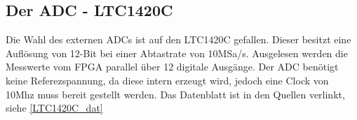 \subsection{Der ADC - LTC1420C}\label{extADC}
 Die Wahl des externen ADCs ist auf den LTC1420C gefallen. Dieser besitzt eine Auflösung von 12-Bit bei einer Abtastrate von 10MSa/s.  Ausgelesen werden die Messwerte vom FPGA parallel über 12 digitale Ausgänge. Der ADC benötigt keine Referezspannung, da diese intern erzeugt wird, jedoch eine Clock von 10Mhz muss bereit gestellt werden.
Das Datenblatt ist in den Quellen verlinkt, siehe \ref{LTC1420C_dat}
